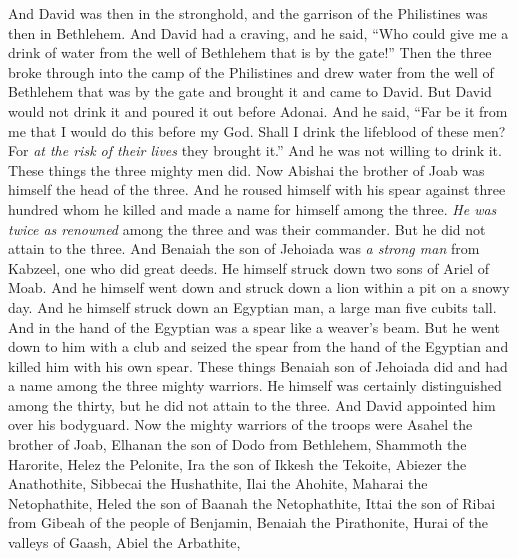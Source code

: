 \begin{biblechapter}
\verse And David was then in the stronghold, and the garrison of the Philistines was then in Bethlehem.
\verse And David had a craving, and he said, “Who could give me a drink of water from the well of Bethlehem that is by the gate!”
\verse Then the three broke through into the camp of the Philistines and drew water from the well of Bethlehem that was by the gate and brought it and came to David. But David would not drink it and poured it out before Adonai.
\verse And he said, “Far be it from me that I would do this before my God. Shall I drink the lifeblood of these men? For \textit{at the risk of their lives} they brought it.” And he was not willing to drink it. These things the three mighty men did.
\verse Now Abishai the brother of Joab was himself the head of the three. And he roused himself with his spear against three hundred whom he killed and made a name for himself among the three.
\verse \textit{He was twice as renowned} among the three and was their commander. But he did not attain to the three.
\verse And Benaiah the son of Jehoiada was \textit{a strong man} from Kabzeel, one who did great deeds. He himself struck down two sons of Ariel of Moab. And he himself went down and struck down a lion within a pit on a snowy day.
\verse And he himself struck down an Egyptian man, a large man five cubits tall. And in the hand of the Egyptian was a spear like a weaver’s beam. But he went down to him with a club and seized the spear from the hand of the Egyptian and killed him with his own spear.
\verse These things Benaiah son of Jehoiada did and had a name among the three mighty warriors.
\verse He himself was certainly distinguished among the thirty, but he did not attain to the three. And David appointed him over his bodyguard.
\verse Now the mighty warriors of the troops were Asahel the brother of Joab, Elhanan the son of Dodo from Bethlehem,
\verse Shammoth the Harorite, Helez the Pelonite,
\verse Ira the son of Ikkesh the Tekoite, Abiezer the Anathothite,
\verse Sibbecai the Hushathite, Ilai the Ahohite,
\verse Maharai the Netophathite, Heled the son of Baanah the Netophathite,
\verse Ittai the son of Ribai from Gibeah of the people of Benjamin, Benaiah the Pirathonite,
\verse Hurai of the valleys of Gaash, Abiel the Arbathite,

\end{biblechapter}
